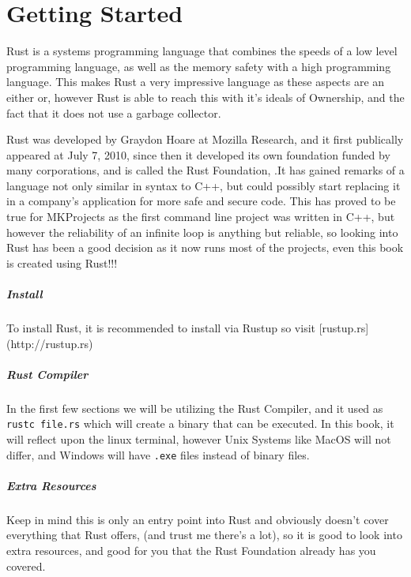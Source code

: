 \chapter{Getting Started}

\par Rust is a systems programming language that combines the speeds of a low level programming 
language, as well as the memory safety with a high programming language. This makes Rust 
a very impressive language as these aspects are an either or, however Rust is able to 
reach this with it's ideals of Ownership, and the fact that it does not use a garbage collector.  

\par Rust was developed by Graydon Hoare at Mozilla Research, and it first publically appeared at July 7, 2010, since then it developed its own foundation funded by many corporations, and is called the Rust Foundation, 
.It has gained remarks of a language not only similar in syntax to C++, but could possibly start replacing it in a company's application for more safe and secure code. This has proved to 
be true for MKProjects as the first command line project was written in C++, but however the reliability 
of an infinite loop is anything but reliable, so looking into Rust has been a good decision as 
it now runs most of the projects, even this book is created using Rust!!!

\paragraph{Install} 
To install Rust, it is recommended to install via Rustup so visit [rustup.rs](http://rustup.rs)

\paragraph{Rust Compiler}

In the first few sections we will be utilizing the Rust Compiler, 
and it used as \verb!rustc file.rs! which will create a binary that can 
be executed. In this book, it will reflect upon the linux terminal, 
however Unix Systems like MacOS will not differ, and Windows will
have \verb!.exe! files instead of binary files. 

\paragraph{Extra Resources}
\par Keep in mind this is only an entry point into Rust and obviously doesn't cover everything that Rust offers, (and trust me there's a lot), so it is 
good to look into extra resources, and good for you that the Rust Foundation already has you covered. 

